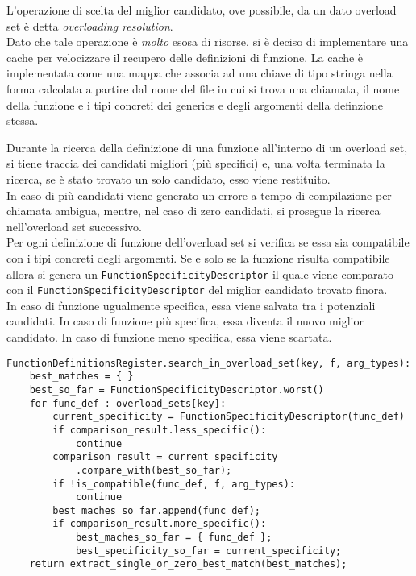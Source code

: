 L'operazione di scelta del miglior candidato, ove possibile, da un dato overload set è detta \textit{overloading resolution}. \\

Dato che tale operazione è \textit{molto} esosa di risorse, si è deciso di implementare una cache per velocizzare
il recupero delle definizioni di funzione. La cache è implementata come una mappa che associa ad una 
chiave di tipo stringa nella forma calcolata a partire dal nome del file in cui si trova una chiamata, il nome 
della funzione e i tipi concreti dei generics e degli argomenti della definzione stessa. \\

\newpage

Durante la ricerca della definizione di una funzione all'interno di un overload set, si tiene traccia dei candidati 
migliori (più specifici) e, una volta terminata la ricerca, se è stato trovato un solo candidato, esso viene restituito. \\

In caso di più candidati viene generato un errore a tempo di compilazione per chiamata ambigua, mentre, nel caso di 
zero candidati, si prosegue la ricerca nell'overload set successivo. \\

Per ogni definizione di funzione dell'overload set si verifica se essa sia compatibile con i tipi concreti 
degli argomenti. Se e solo se la funzione risulta compatibile allora si genera un \texttt{FunctionSpecificityDescriptor} il quale
viene comparato con il \texttt{FunctionSpecificityDescriptor} del miglior candidato trovato finora. \\

In caso di funzione ugualmente specifica, essa viene salvata tra i potenziali candidati. In caso di funzione più specifica, 
essa diventa il nuovo miglior candidato. In caso di funzione meno specifica, essa viene scartata. \\

\vspace{0.5cm}
\begin{lstlisting}[frame=single]
FunctionDefinitionsRegister.search_in_overload_set(key, f, arg_types):
    best_matches = { }
    best_so_far = FunctionSpecificityDescriptor.worst()
    for func_def : overload_sets[key]: 
        current_specificity = FunctionSpecificityDescriptor(func_def)
        if comparison_result.less_specific(): 
            continue
        comparison_result = current_specificity
            .compare_with(best_so_far);
        if !is_compatible(func_def, f, arg_types): 
            continue
        best_maches_so_far.append(func_def);
        if comparison_result.more_specific(): 
            best_maches_so_far = { func_def };
            best_specificity_so_far = current_specificity;
    return extract_single_or_zero_best_match(best_matches);
\end{lstlisting}
\vspace{0.5cm}

